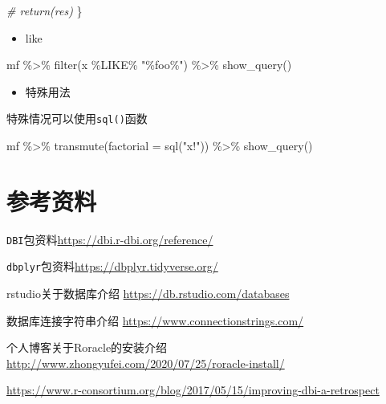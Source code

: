 \documentclass[
]{book}
\newenvironment{Shaded}{\begin{snugshade}}{\end{snugshade}}
\newcommand{\AttributeTok}[1]{\textcolor[rgb]{0.77,0.63,0.00}{#1}}
\newcommand{\CommentTok}[1]{\textcolor[rgb]{0.56,0.35,0.01}{\textit{#1}}}
\newcommand{\FunctionTok}[1]{\textcolor[rgb]{0.00,0.00,0.00}{#1}}
\newcommand{\NormalTok}[1]{#1}
\newcommand{\SpecialCharTok}[1]{\textcolor[rgb]{0.00,0.00,0.00}{#1}}
\newcommand{\StringTok}[1]{\textcolor[rgb]{0.31,0.60,0.02}{#1}}
\providecommand{\tightlist}{%
  \setlength{\itemsep}{0pt}\setlength{\parskip}{0pt}}
\begin{document}
\begin{Shaded}
\begin{Highlighting}[]
  \CommentTok{\# return(res)}
\NormalTok{\}}
\end{Highlighting}
\end{Shaded}

\begin{itemize}
\tightlist
\item
  like
\end{itemize}

\begin{Shaded}
\begin{Highlighting}[]
\NormalTok{mf }\SpecialCharTok{\%\textgreater{}\%} 
  \FunctionTok{filter}\NormalTok{(x }\SpecialCharTok{\%LIKE\%} \StringTok{"\%foo\%"}\NormalTok{) }\SpecialCharTok{\%\textgreater{}\%} 
  \FunctionTok{show\_query}\NormalTok{()}
\end{Highlighting}
\end{Shaded}

\begin{itemize}
\tightlist
\item
  特殊用法
\end{itemize}

特殊情况可以使用\texttt{sql()}函数

\begin{Shaded}
\begin{Highlighting}[]
\NormalTok{mf }\SpecialCharTok{\%\textgreater{}\%} 
  \FunctionTok{transmute}\NormalTok{(}\AttributeTok{factorial =} \FunctionTok{sql}\NormalTok{(}\StringTok{"x!"}\NormalTok{)) }\SpecialCharTok{\%\textgreater{}\%} 
  \FunctionTok{show\_query}\NormalTok{()}
\end{Highlighting}
\end{Shaded}

\hypertarget{ux53c2ux8003ux8d44ux6599}{%
\section{参考资料}\label{ux53c2ux8003ux8d44ux6599}}

\texttt{DBI}包资料\url{https://dbi.r-dbi.org/reference/}

\texttt{dbplyr}包资料\url{https://dbplyr.tidyverse.org/}

rstudio关于数据库介绍 \url{https://db.rstudio.com/databases}

数据库连接字符串介绍 \url{https://www.connectionstrings.com/}

个人博客关于Roracle的安装介绍 \url{http://www.zhongyufei.com/2020/07/25/roracle-install/}

\url{https://www.r-consortium.org/blog/2017/05/15/improving-dbi-a-retrospect}
\end{document}

